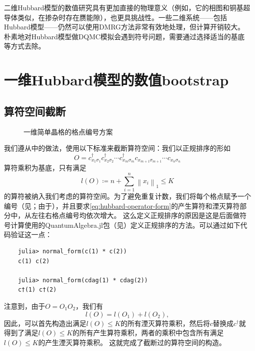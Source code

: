 \documentclass[oneside]{fduthesis}
\begin{document}
二维Hubbard模型的数值研究具有更加直接的物理意义（例如，它的相图和铜基超导体类似，在掺杂时存在赝能隙\cite{2d-hubbard-numerical}），也更具挑战性。一些二维系统——包括Hubbard模型——仍然可以使用DMRG方法非常有效地处理，但计算开销较大\cite{Stoudenmire_2012}。
朴素地对Hubbard模型做DQMC模拟会遇到符号问题，需要通过选择适当的基底等方式去除\cite{pgp-sign}。

\section{一维Hubbard模型的数值bootstrap}\label{sec:one-dimensional-hubbard}

\subsection{算符空间截断}

\begin{figure}
    \centering
    
    \caption{一维简单晶格的格点编号方案}
    \label{fig:1d-lattice-index}
\end{figure}

我们遵从\parencite{han_manybody}中的做法，使用以下标准来截断算符空间：我们以正规排序的形如
\begin{equation}
    O = c^\dagger_{{x}_1 \sigma_1} c^\dagger_{x_2 \sigma_2} \cdots c^\dagger_{x_m \sigma_m} c_{x_{m+1} \sigma_{m+1}} \cdots c_{x_{n} \sigma_n}
    \label{eq:hubbard-operator-form}
\end{equation}
算符乘积为基底，只有满足
\begin{equation}
    l(O) \coloneqq n + \sum_{i=1}^n \left\| x_{i} \right\|_1 \leq K
    \label{eq:operator-space-criteria}
\end{equation}
的算符被纳入我们考虑的算符空间。为了避免重复计数，我们将每个格点赋予一个编号（见；由于），并且要求\eqref{eq:hubbard-operator-form}的产生算符和湮灭算符部分中，从左往右格点编号均依次增大。
这么定义正规排序的原因是这是后面做符号计算使用的QuantumAlgebra.jl包（见）定义正规排序的方法。可以通过如下代码验证这一点：
\begin{verbatim}
    julia> normal_form(c(1) * c(2))
    c(1) c(2)

    julia> normal_form(cdag(1) * cdag(2))
    c†(1) c†(2)
\end{verbatim}

注意到，由于$O = O_1 O_2$，我们有
\begin{equation}
    l(O) = l(O_1) + l(O_2),
\end{equation}
因此，可以首先构造出满足$l(O) \leq K$的所有湮灭算符乘积，然后将$c$替换成$c^\dagger$就得到了满足$l(O) \leq K$的所有产生算符乘积，两者的乘积中包含所有满足$l(O) \leq K$的产生湮灭算符乘积。
这就完成了截断过的算符空间的构造。
\end{document}
